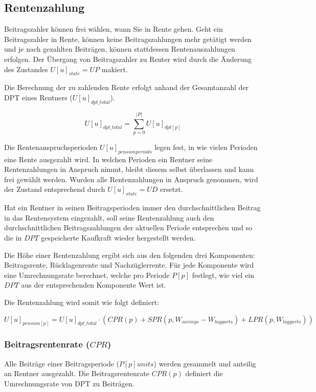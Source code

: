 \subsection{Rentenzahlung}

Beitragszahler können frei wählen, wann Sie in Rente gehen. Geht ein Beitragszahler in Rente, können keine Beitragszahlungen mehr getätigt werden und je nach gezahlten Beiträgen, können stattdessen Rentenauszahlungen erfolgen. Der Übergang von Beitragszahler zu Renter wird durch die Änderung des Zustandes $U[u]_{state} = UP$ makiert.

Die Berechnung der zu zahlenden Rente erfolgt anhand der Gesamtanzahl der DPT eines Rentners ($U[u]_{dpt\_total}$).

\begin{equation}
U[u]_{dpt\_total} = \sum_{p=0}^{|P|} U[u]_{dpt[p]}
\end{equation}

Die Rentenanspruchsperioden $U[u]_{pensionperiods}$ legen fest, in wie vielen Perioden eine Rente ausgezahlt wird. In
welchen Perioden ein Rentner seine Rentenzahlungen in Anspruch nimmt, bleibt diesem selbst überlassen und kann frei
gewählt werden. Wurden alle Rentenzahlungen in Anspruch genommen, wird der Zustand entsprechend durch $U[u]_{state} = UD$ ersetzt.

Hat ein Rentner in seinen Beitragsperioden immer den durchschnittlichen Beitrag in das
Rentensystem eingezahlt, soll seine
Rentenzahlung auch den durchschnittlichen Beitragszahlungen der aktuellen
Periode entsprechen und so die in $DPT$ gespeicherte Kaufkraft wieder hergestellt werden.

Die Höhe einer Rentenzahlung ergibt sich aus den folgenden drei Komponenten: Beitragsrente, Rücklagenrente und Nachzüglerrente. Für jede Komponente wird eine Umrechnungsrate berechnet, welche pro 
Periode $P[p]$ festlegt, wie viel ein $DPT$ aus der entsprechenden
Komponente Wert ist.

Die Rentenzahlung wird somit wie folgt definiert:

\begin{dmath}
U[u]_{pension[p]} = U[u]_{dpt\_total} \cdot (CPR(p) + SPR(p, W_{savings} - W_{laggarts}) + LPR(p, W_{laggarts}))
\end{dmath}

\subsubsection{Beitragsrentenrate ($CPR$)}
Alle Beiträge einer Beitragsperiode ($P[p]units$) werden gesammelt und anteilig an Rentner ausgezahlt. Die Beitragsrentenrate $CPR(p)$ definiert die Umrechnungsrate von DPT zu Beiträgen.

